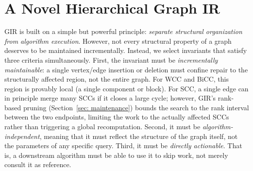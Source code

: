 

%



\section{A Novel Hierarchical Graph IR}

\label{sec: construction}



GIR is built on a simple but powerful principle: \emph{separate structural organization from algorithm execution}.
However, not every structural property of a graph deserves to be maintained incrementally.
Instead, we select 
invariants that satisfy three criteria simultaneously.
First, the invariant must be \emph{incrementally maintainable}: a single
vertex/edge insertion or deletion must confine repair to the structurally
affected region, not the entire graph.
For WCC and BiCC, this region is provably local (a single component or block).
For SCC, a single edge can in principle merge many SCCs if it closes a large
cycle; however, GIR's rank-based pruning (Section~\ref{sec: maintenance})
bounds the search to the rank interval between the two endpoints, limiting the
work to the actually affected SCCs rather than triggering a global recomputation.
Second, it must be \emph{algorithm-independent}, meaning that it must reflect the structure of the graph itself, not the parameters of any
specific query.
Third, it must be \emph{directly actionable}. That is, a downstream
algorithm must be able to use it to skip work, not merely consult
it as reference.

